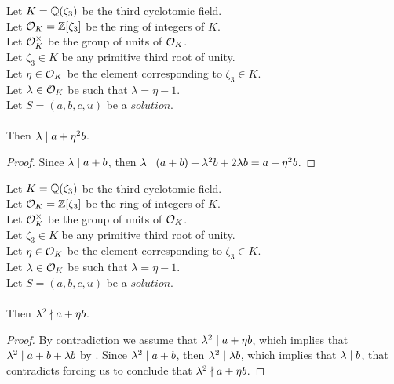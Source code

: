 \begin{lemma}
    \label{lmm:lambda_dvd_a_add_eta_sq_mul_b}
    \leanok
    Let $K = \mathbb{Q}(\zeta_3)$ be the third cyclotomic field. \\
    Let $\mathcal{O}_K = \mathbb{Z}[\zeta_3]$ be the ring of integers of $K$. \\
    Let $\mathcal{O}^\times_K$ be the group of units of $\mathcal{O}_K$. \\
    Let $\zeta_3 \in K$ be any primitive third root of unity. \\
    Let $\eta \in \mathcal{O}_K$ be the element corresponding to $\zeta_3 \in K$. \\
    Let $\lambda \in \mathcal{O}_K$ be such that $\lambda = \eta -1$. \\
    Let $S=(a, b, c, u)$ be a $solution$.\\\\
    Then $\lambda \mid a + \eta^2  b$.
\end{lemma}
\begin{proof}
    \leanok
    Since $\lambda \mid a+b$, then
    $\lambda \mid (a + b) + \lambda^2  b + 2  \lambda  b
    = a + \eta^2  b$.
\end{proof}

\begin{lemma}
    \label{lmm:lambda_sq_not_dvd_a_add_eta_mul_b}
    \leanok
    Let $K = \mathbb{Q}(\zeta_3)$ be the third cyclotomic field. \\
    Let $\mathcal{O}_K = \mathbb{Z}[\zeta_3]$ be the ring of integers of $K$. \\
    Let $\mathcal{O}^\times_K$ be the group of units of $\mathcal{O}_K$. \\
    Let $\zeta_3 \in K$ be any primitive third root of unity. \\
    Let $\eta \in \mathcal{O}_K$ be the element corresponding to $\zeta_3 \in K$. \\
    Let $\lambda \in \mathcal{O}_K$ be such that $\lambda = \eta -1$. \\
    Let $S=(a, b, c, u)$ be a $solution$.\\\\
    Then $\lambda^2 \nmid a + \eta b$.
\end{lemma}
\begin{proof}
    \leanok
    By contradiction we assume that $\lambda^2 \mid a + \eta b$, which implies that
    $\lambda^2 \mid a + b + \lambda  b$ by .
    Since $\lambda^2 \mid a+b$, then $\lambda^2 \mid \lambda  b$, which implies that
    $\lambda \mid b$, that contradicts  forcing us to conclude that
    $\lambda^2 \nmid a + \eta b$.
\end{proof}

